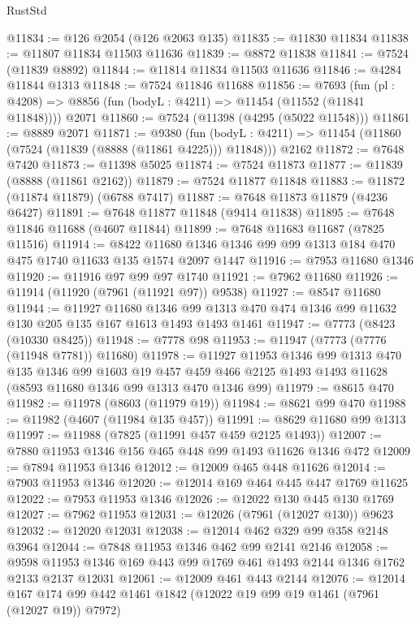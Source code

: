 \begin{lexlean}{RustStd}
\begin{coremodule}
@11834 := @126 @2054 (@126 @2063 @135)
@11835 := @11830 @11834
@11838 := @11807 @11834 @11503 @11636
@11839 := @8872 @11838
@11841 := @7524 (@11839 @8892)
@11844 := @11814 @11834 @11503 @11636
@11846 := @4284 @11844 @1313
@11848 := @7524 @11846 @11688
@11856 := @7693
    (fun (pl : @4208) => @8856 (fun (bodyL : @4211) => @11454 (@11552 (@11841 @11848))))
    @2071
@11860 := @7524 (@11398 (@4295 (@5022 @11548)))
@11861 := @8889 @2071
@11871 := @9380
    (fun (bodyL : @4211) => @11454 (@11860 (@7524 (@11839 (@8888 (@11861 @4225))) @11848)))
    @2162
@11872 := @7648 @7420
@11873 := @11398 @5025
@11874 := @7524 @11873
@11877 := @11839 (@8888 (@11861 @2162))
@11879 := @7524 @11877 @11848
@11883 := @11872 (@11874 @11879) (@6788 @7417)
@11887 := @7648 @11873 @11879 (@4236 @6427)
@11891 := @7648 @11877 @11848 (@9414 @11838)
@11895 := @7648 @11846 @11688 (@4607 @11844)
@11899 := @7648 @11683 @11687 (@7825 @11516)
@11914 := @8422 @11680 @1346 @1346 @99 @99 @1313 @184 @470 @475 @1740 @11633 @135 @1574 @2097 @1447
@11916 := @7953 @11680 @1346
@11920 := @11916 @97 @99 @97 @1740
@11921 := @7962 @11680
@11926 := @11914 (@11920 (@7961 (@11921 @97)) @9538)
@11927 := @8547 @11680
@11944 := @11927
    @11680
    @1346
    @99
    @1313
    @470
    @474
    @1346
    @99
    @11632
    @130
    @205
    @135
    @167
    @1613
    @1493
    @1493
    @1461
@11947 := @7773 (@8423 (@10330 @8425))
@11948 := @7778 @98
@11953 := @11947 (@7773 (@7776 (@11948 @7781)) @11680)
@11978 := @11927
    @11953
    @1346
    @99
    @1313
    @470
    @135
    @1346
    @99
    @1603
    @19
    @457
    @459
    @466
    @2125
    @1493
    @1493
    @11628
    (@8593 @11680 @1346 @99 @1313 @470 @1346 @99)
@11979 := @8615 @470
@11982 := @11978 (@8603 (@11979 @19))
@11984 := @8621 @99 @470
@11988 := @11982 (@4607 (@11984 @135 @457))
@11991 := @8629 @11680 @99 @1313
@11997 := @11988 (@7825 (@11991 @457 @459 @2125 @1493))
@12007 := @7880 @11953 @1346 @156 @465 @448 @99 @1493 @11626 @1346 @472
@12009 := @7894 @11953 @1346
@12012 := @12009 @465 @448 @11626
@12014 := @7903 @11953 @1346
@12020 := @12014 @169 @464 @445 @447 @1769 @11625
@12022 := @7953 @11953 @1346
@12026 := @12022 @130 @445 @130 @1769
@12027 := @7962 @11953
@12031 := @12026 (@7961 (@12027 @130)) @9623
@12032 := @12020 @12031
@12038 := @12014 @462 @329 @99 @358 @2148 @3964
@12044 := @7848 @11953 @1346 @462 @99 @2141 @2146
@12058 := @9598 @11953 @1346 @169 @443 @99 @1769 @461 @1493 @2144 @1346 @1762 @2133 @2137 @12031
@12061 := @12009 @461 @443 @2144
@12076 := @12014
    @167
    @174
    @99
    @442
    @1461
    @1842
    (@12022 @19 @99 @19 @1461 (@7961 (@12027 @19)) @7972)

\end{coremodule}
\end{lexlean}

